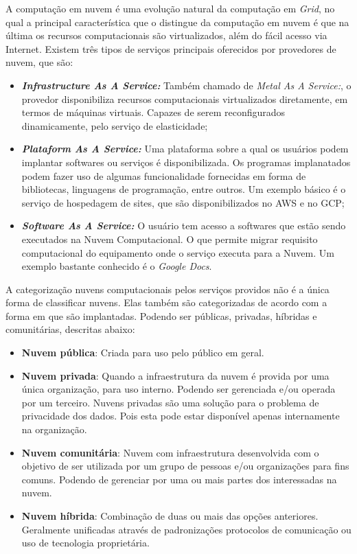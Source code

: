 A computação em nuvem é uma evolução natural da computação em \textit{Grid}, no qual a principal característica que o distingue da computação em nuvem é que na última os recursos computacionais são virtualizados, além do fácil acesso via Internet. Existem três tipos de serviços principais oferecidos por provedores de nuvem, que são\cite{NIST_CLOUD_DEFINITION}:

\begin{itemize}
	\item \textbf{\textit{Infrastructure As A Service:}} Também chamado de \textit{Metal As A Service:}, o provedor disponibiliza recursos computacionais virtualizados diretamente, em termos de máquinas virtuais. Capazes de serem reconfigurados dinamicamente, pelo serviço de elasticidade;
	\item \textbf{\textit{Plataform As A Service:}} Uma plataforma sobre a qual os usuários podem implantar softwares ou serviços é disponibilizada. Os programas implanatados podem fazer uso de algumas funcionalidade fornecidas em forma de bibliotecas, linguagens de programação, entre outros. Um exemplo básico é o serviço de hospedagem de sites, que são disponibilizados no \acrshort{AWS} e no \acrshort{GCP};
	\item \textbf{\textit{Software As A Service:}} O usuário tem acesso a softwares que estão sendo executados na Nuvem Computacional. O que permite migrar requisito computacional do equipamento onde o serviço executa para a Nuvem. Um exemplo bastante conhecido é o \textit{Google Docs}\cite{GoogleDocs}.
\end{itemize}

A categorização nuvens computacionais pelos serviços providos não é a única forma de classificar nuvens. Elas também são categorizadas de acordo com a forma em que são implantadas. Podendo ser públicas, privadas, híbridas e comunitárias, descritas abaixo\cite{NIST_CLOUD_DEFINITION}:

\begin{itemize}
	\item \textbf{Nuvem pública}: Criada para uso pelo público em geral.
	\item \textbf{Nuvem privada}: Quando a infraestrutura da nuvem é provida por uma única organização, para uso interno. Podendo ser gerenciada e/ou operada por um terceiro. Nuvens privadas são uma solução para o problema de privacidade dos dados. Pois esta pode estar disponível apenas internamente na organização.
	\item \textbf{Nuvem comunitária}: Nuvem com infraestrutura desenvolvida com o objetivo de ser utilizada por um grupo de pessoas e/ou organizações para fins comuns. Podendo de gerenciar por uma ou mais partes dos interessadas na nuvem.
	\item \textbf{Nuvem híbrida}: Combinação de duas ou mais das opções anteriores. Geralmente unificadas através de padronizações protocolos de comunicação ou uso de tecnologia proprietária.
\end{itemize}

